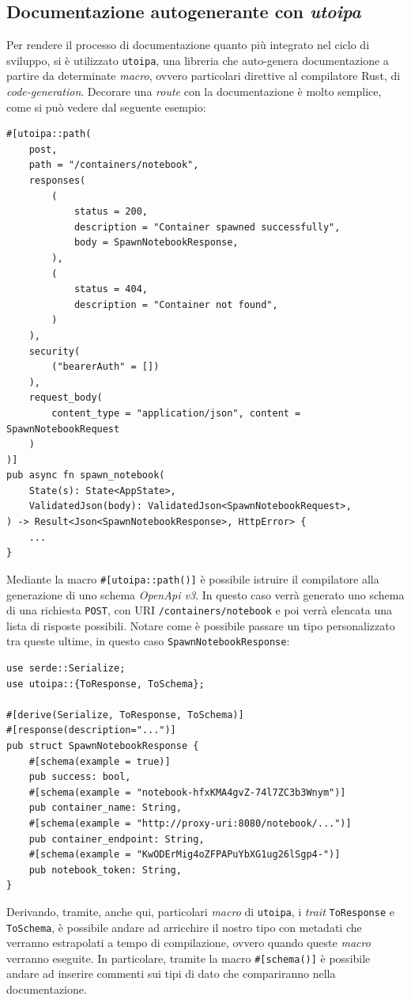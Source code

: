 \subsection{Documentazione autogenerante con \textit{utoipa}}
Per rendere il processo di documentazione quanto più integrato nel ciclo di sviluppo, si è utilizzato \verb|utoipa|, una libreria che auto-genera documentazione a partire da determinate \textit{macro}, ovvero particolari direttive al compilatore Rust, di \textit{code-generation}.
\newline
Decorare una \textit{route} con la documentazione è molto semplice, come si può vedere dal seguente esempio:
\begin{verbatim}
#[utoipa::path(
    post,
    path = "/containers/notebook",
    responses(
        (
            status = 200, 
            description = "Container spawned successfully", 
            body = SpawnNotebookResponse,
        ),
        (
            status = 404,
            description = "Container not found",
        )
    ),
    security(
        ("bearerAuth" = [])
    ),
    request_body(
        content_type = "application/json", content = SpawnNotebookRequest
    )
)]
pub async fn spawn_notebook(
    State(s): State<AppState>,
    ValidatedJson(body): ValidatedJson<SpawnNotebookRequest>,
) -> Result<Json<SpawnNotebookResponse>, HttpError> {
    ...
}
\end{verbatim}
Mediante la macro \verb|#[utoipa::path()]| è possibile istruire il compilatore alla generazione di uno schema \textit{OpenApi v3}. In questo caso verrà generato uno schema di una richiesta \verb|POST|, con URI \verb|/containers/notebook| e poi verrà elencata una lista di risposte possibili. Notare come è possibile passare un tipo personalizzato tra queste ultime, in questo caso \verb|SpawnNotebookResponse|:
\begin{verbatim}
use serde::Serialize;
use utoipa::{ToResponse, ToSchema};

#[derive(Serialize, ToResponse, ToSchema)]
#[response(description="...")]
pub struct SpawnNotebookResponse {
    #[schema(example = true)]
    pub success: bool,
    #[schema(example = "notebook-hfxKMA4gvZ-74l7ZC3b3Wnym")]
    pub container_name: String,
    #[schema(example = "http://proxy-uri:8080/notebook/...")]
    pub container_endpoint: String,
    #[schema(example = "KwODErMig4oZFPAPuYbXG1ug26lSgp4-")]
    pub notebook_token: String,
}
\end{verbatim}
Derivando, tramite, anche qui, particolari \textit{macro} di \verb|utoipa|, i \textit{trait} \verb|ToResponse| e \verb|ToSchema|, è possibile andare ad arricchire il nostro tipo con metadati che verranno estrapolati a tempo di compilazione, ovvero quando queste \textit{macro} verranno eseguite. In particolare, tramite la macro \verb|#[schema()]| è possibile andare ad inserire commenti sui tipi di dato che compariranno nella documentazione. 
